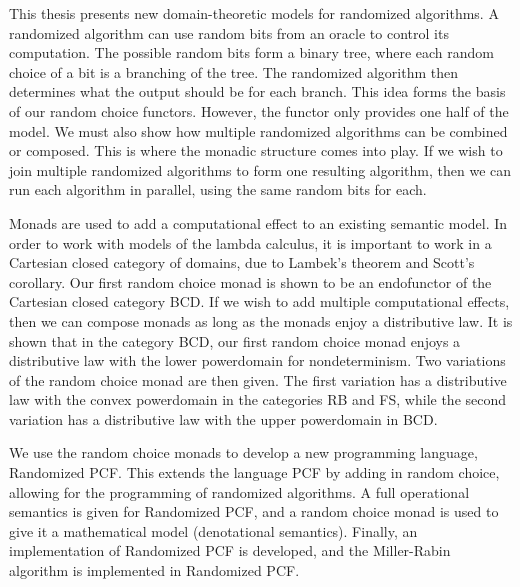 This thesis presents new domain-theoretic models for randomized algorithms.  A randomized algorithm can use random bits from an oracle to control its computation.  The possible random bits form a binary tree, where each random choice of a bit is a branching of the tree.  The randomized algorithm then determines what the output should be for each branch.  This idea forms the basis of our random choice functors.  However, the functor only provides one half of the model.  We must also show how multiple randomized algorithms can be combined or composed.  This is where the monadic structure comes into play.  If we wish to join multiple randomized algorithms to form one resulting algorithm, then we can run each algorithm in parallel, using the same random bits for each.

Monads are used to add a computational effect to an existing semantic model.  In order to work with models of the lambda calculus, it is important to work in a Cartesian closed category of domains, due to Lambek's theorem and Scott's corollary.  Our first random choice monad is shown to be an endofunctor of the Cartesian closed category \textsf{BCD}.  
If we wish to add multiple computational effects, then we can compose monads as long as the monads enjoy a distributive law.  It is shown that in the category \textsf{BCD}, our first random choice monad enjoys a distributive law with the lower powerdomain for nondeterminism.
Two variations of the random choice monad are then given.  The first variation has a distributive law with the convex powerdomain in the categories \textsf{RB} and \textsf{FS}, while the second variation has a distributive law with the upper powerdomain in \textsf{BCD}.

We use the random choice monads to develop a new programming language, Randomized PCF.  This extends the language PCF by adding in random choice, allowing for the programming of randomized algorithms.  A full operational semantics is given for Randomized PCF, and a random choice monad is used to give it a mathematical model (denotational semantics).  Finally, an implementation of Randomized PCF is developed, and the Miller-Rabin algorithm is implemented in Randomized PCF.